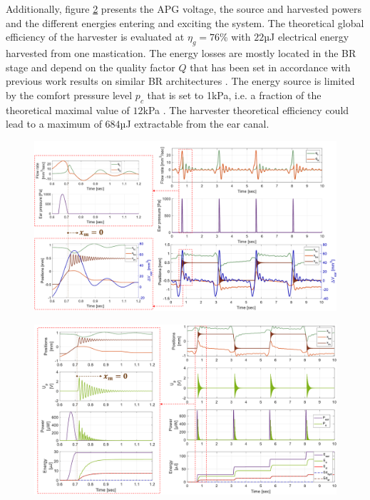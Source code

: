 \documentclass[3p,twocolumn,preprint]{elsarticle}
\begin{document}
Additionally, figure \ref{fig:positions_Up_puissances_energies} presents the APG voltage, the source and harvested powers and the different energies entering and exciting the system. The theoretical global efficiency of the harvester is evaluated at \mbox{$\eta_g=76$\%} with $22$µJ electrical energy harvested from one mastication. The energy losses are mostly located in the BR stage and depend on the quality factor $Q$ that has been set in accordance with previous work results on similar BR architectures \cite{Liu2013}. The energy source is limited by the comfort pressure level $p_c$ that is set to 1kPa, i.e. a fraction of the theoretical maximal value of $12$kPa \cite{Bouchard-Roy2020}. The harvester theoretical efficiency could lead to a maximum of $684$µJ extractable from the ear canal.

\begin{figure}[!htbp]
	\centering
	\captionsetup{justification=centering}
	\includegraphics[trim={0cm 0cm 0cm 0.5cm},clip, width=\textwidth]{figures/positions+DeltaV_debits_pear.pdf}
	\caption{}
	\label{fig:positions+DeltaV_debits_pear}
\end{figure}
\begin{figure}[!htbp]
	\centering
	\captionsetup{justification=centering}
	\includegraphics[trim={0cm 0cm 0cm 0cm},clip, width=\textwidth]{figures/positions_Up_puissances_energies.pdf}
	\caption{}
	\label{fig:positions_Up_puissances_energies}
\end{figure}
\end{document}
